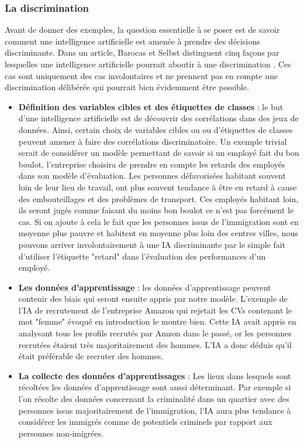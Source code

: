 \subsubsection{La discrimination}
Avant de donner des exemples, la question essentielle à se poser est de savoir comment une intelligence artificielle est amenée à prendre des décisions discriminante. Dans un article, Barocas et Selbst distinguent cinq façons par lesquelles une intelligence artificielle pourrait aboutir à une discrimination \cite{discriminationWay}. Ces cas sont uniquement des cas involontaires et ne prennent pas en compte une discrimination délibérée qui pourrait bien évidemment être possible.
\begin{itemize}
    \item \textbf{Définition des variables cibles et des étiquettes de classes} : le but d'une intelligence artificielle est de découvrir des corrélations dans des jeux de données. Ainsi, certain choix de variables cibles ou ou d'étiquettes de classes peuvent amener à faire des corrélations discriminatoire. Un exemple trivial serait de considérer un modèle permettant de savoir si un employé fait du bon boulot, l'entreprise choisira de prendre en compte les retards des employés dans son modèle d'évaluation. Les personnes défavorisées habitant souvent loin de leur lieu de travail, ont plus souvent tendance à être en retard à cause des embouteillages et des problèmes de transport. Ces employés habitant loin, ils seront jugés comme faisant du moins bon boulot ce n'est pas forcément le cas. Si on ajoute à cela le fait que les personnes issus de l'immigration sont en moyenne plus pauvre et habitent en moyenne plus loin des centres villes, nous pouvons arriver involontairement à une IA discriminante par le simple fait d'utiliser l'étiquette "retard" dans l'évaluation des performances d'un employé.
    \item \textbf{Les données d'apprentissage} : les données d'apprentissage peuvent contenir des biais qui seront ensuite appris par notre modèle. L'exemple de l'IA de recrutement de l'entreprise Amazon qui rejetait les CVs contenant le mot "femme" évoqué en introduction le montre bien. Cette IA avait appris en analysant tous les profils recrutés par Amzon dans le passé, or les personnes recrutées étaient très majoritairement des hommes. L'IA a donc déduis qu'il était préférable de recruter des hommes. 
    \item \textbf{La collecte des données d'apprentissages} : Les lieux dans lesquels sont récoltées les données d'apprentissage sont aussi déterminant. Par exemple si l'on récolte des données concernant la criminalité dans un quartier avec des personnes issus majoritairement de l'immigration, l'IA aura plus tendance à considérer les immigrés comme de potentiels criminels par rapport aux personnes non-imigrées.

\end{itemize}
